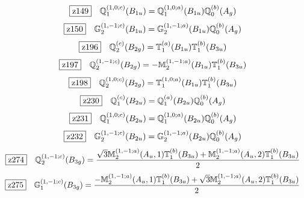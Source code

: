 \documentclass[fleqn,10pt,landscape]{jsarticle}
\begin{document}
\begin{dmath*}
\hspace*{3mm}\fbox{z149}\quad \mathbb{Q}_{1}^{(1,0;c)}(B_{1u})=\mathbb{Q}_{1}^{(1,0;a)}(B_{1u}) \mathbb{Q}_{0}^{(b)}(A_{g})
\end{dmath*}
\begin{dmath*}
\hspace*{3mm}\fbox{z150}\quad \mathbb{G}_{2}^{(1,-1;c)}(B_{1u})=\mathbb{G}_{2}^{(1,-1;a)}(B_{1u}) \mathbb{Q}_{0}^{(b)}(A_{g})
\end{dmath*}
\begin{dmath*}
\hspace*{3mm}\fbox{z196}\quad \mathbb{Q}_{2}^{(c)}(B_{2g})=\mathbb{T}_{1}^{(a)}(B_{1u}) \mathbb{T}_{1}^{(b)}(B_{3u})
\end{dmath*}
\begin{dmath*}
\hspace*{3mm}\fbox{z197}\quad \mathbb{Q}_{2}^{(1,-1;c)}(B_{2g})=- \mathbb{M}_{2}^{(1,-1;a)}(B_{1u}) \mathbb{T}_{1}^{(b)}(B_{3u})
\end{dmath*}
\begin{dmath*}
\hspace*{3mm}\fbox{z198}\quad \mathbb{Q}_{2}^{(1,0;c)}(B_{2g})=\mathbb{T}_{1}^{(1,0;a)}(B_{1u}) \mathbb{T}_{1}^{(b)}(B_{3u})
\end{dmath*}
\begin{dmath*}
\hspace*{3mm}\fbox{z230}\quad \mathbb{Q}_{1}^{(c)}(B_{2u})=\mathbb{Q}_{1}^{(a)}(B_{2u}) \mathbb{Q}_{0}^{(b)}(A_{g})
\end{dmath*}
\begin{dmath*}
\hspace*{3mm}\fbox{z231}\quad \mathbb{Q}_{1}^{(1,0;c)}(B_{2u})=\mathbb{Q}_{1}^{(1,0;a)}(B_{2u}) \mathbb{Q}_{0}^{(b)}(A_{g})
\end{dmath*}
\begin{dmath*}
\hspace*{3mm}\fbox{z232}\quad \mathbb{G}_{2}^{(1,-1;c)}(B_{2u})=\mathbb{G}_{2}^{(1,-1;a)}(B_{2u}) \mathbb{Q}_{0}^{(b)}(A_{g})
\end{dmath*}
\begin{dmath*}
\hspace*{3mm}\fbox{z274}\quad \mathbb{Q}_{2}^{(1,-1;c)}(B_{3g})=\frac{\sqrt{3} \mathbb{M}_{2}^{(1,-1;a)}(A_{u},1) \mathbb{T}_{1}^{(b)}(B_{3u}) + \mathbb{M}_{2}^{(1,-1;a)}(A_{u},2) \mathbb{T}_{1}^{(b)}(B_{3u})}{2}
\end{dmath*}
\begin{dmath*}
\hspace*{3mm}\fbox{z275}\quad \mathbb{G}_{1}^{(1,-1;c)}(B_{3g})=\frac{- \mathbb{M}_{2}^{(1,-1;a)}(A_{u},1) \mathbb{T}_{1}^{(b)}(B_{3u}) + \sqrt{3} \mathbb{M}_{2}^{(1,-1;a)}(A_{u},2) \mathbb{T}_{1}^{(b)}(B_{3u})}{2}
\end{dmath*}
\end{document}
